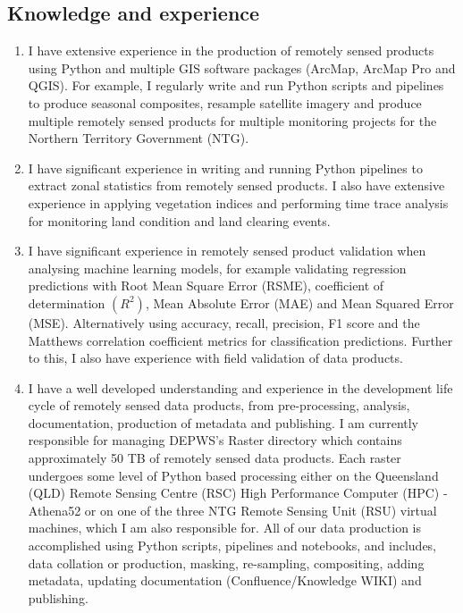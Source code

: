 \documentclass[a4paper,11pt]{article}
\begin{document}
\subsection{Knowledge and experience}
\begin{enumerate}

\item  I have extensive experience in the production of remotely sensed products using Python and multiple
GIS software packages (ArcMap, ArcMap Pro and QGIS). For example, I regularly write and run
Python scripts and pipelines to produce seasonal composites, resample satellite imagery and produce multiple remotely sensed products for multiple monitoring projects for the Northern Territory Government (NTG).

\item I have significant experience in writing and running Python pipelines to extract zonal statistics from remotely sensed products. I also have extensive experience in applying vegetation indices and performing time trace analysis for monitoring land condition and land clearing events.

\item I have significant experience in remotely sensed product validation when analysing machine learning models, for example validating regression predictions with Root Mean Square Error (RSME), coefficient of determination $(R^{2})$, Mean Absolute Error (MAE) and Mean Squared Error (MSE). Alternatively using accuracy, recall, precision, F1 score and the Matthews correlation coefficient metrics for classification predictions. Further to this, I also have experience with field validation of data products.

\item I have a well developed understanding and experience in the development life cycle of remotely sensed data products, from pre-processing, analysis, documentation, production of metadata and publishing. I am currently responsible for managing DEPWS's Raster directory which contains approximately 50 TB of remotely sensed data products. Each raster undergoes some level of Python based processing either on the Queensland (QLD) Remote Sensing Centre (RSC) High Performance Computer (HPC) - Athena52 or on one of the three NTG Remote Sensing Unit (RSU) virtual machines, which I am also responsible for. All of our data production is accomplished using Python scripts, pipelines and notebooks, and includes, data collation or production, masking, re-sampling, compositing, adding metadata, updating documentation (Confluence/Knowledge WIKI) and publishing. 

\end{enumerate}
\end{document}
